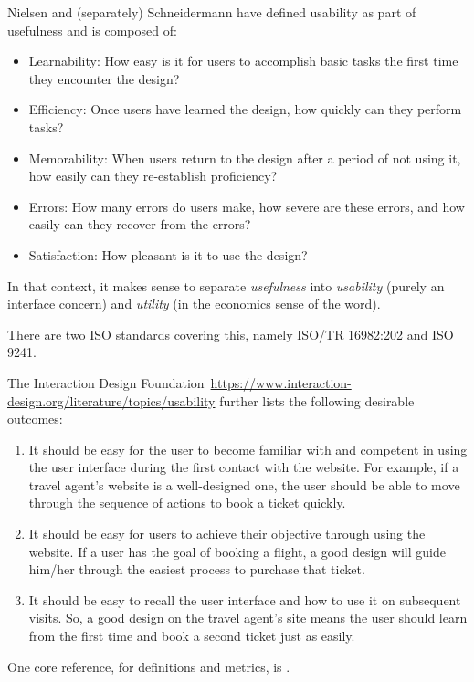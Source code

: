 \documentclass[letterpaper,cleveref]{lipics-v2019}
\theoremstyle{definition}
\begin{document}
Nielsen and (separately) Schneidermann have defined usability as part of usefulness and
is composed of:
\begin{itemize}
\item Learnability: How easy is it for users to accomplish basic tasks the
  first time they encounter the design?
\item Efficiency: Once users have learned the design, how quickly can they perform tasks?
\item Memorability: When users return to the design after a period of not using
  it, how easily can they re-establish proficiency?
\item Errors: How many errors do users make, how severe are these errors, and
  how easily can they recover from the errors?
\item Satisfaction: How pleasant is it to use the design?
\end{itemize}
In that context, it makes sense to separate \emph{usefulness} into
\emph{usability} (purely an interface concern) and \emph{utility} (in the economics
sense of the word).

There are two ISO standards covering this, namely ISO/TR 16982:202 and ISO 9241. 

The Interaction Design Foundation~\url{https://www.interaction-design.org/literature/topics/usability}
further lists the following desirable outcomes:

\begin{enumerate}
\item It should be easy for the user to become familiar with and competent in using
the user interface during the first contact with the website. For example, if a
travel agent’s website is a well-designed one, the user should be able to move
through the sequence of actions to book a ticket quickly.
\item It should be easy for users to achieve their objective through using the
website. If a user has the goal of booking a flight, a good design will guide
him/her through the easiest process to purchase that ticket.
\item It should be easy to recall the user interface and how to use it on
subsequent visits. So, a good design on the travel agent’s site means the user
should learn from the first time and book a second ticket just as easily.
\end{enumerate}

One core reference, for definitions and metrics, is
\citet{bevan1995measuring}.
\end{document}
